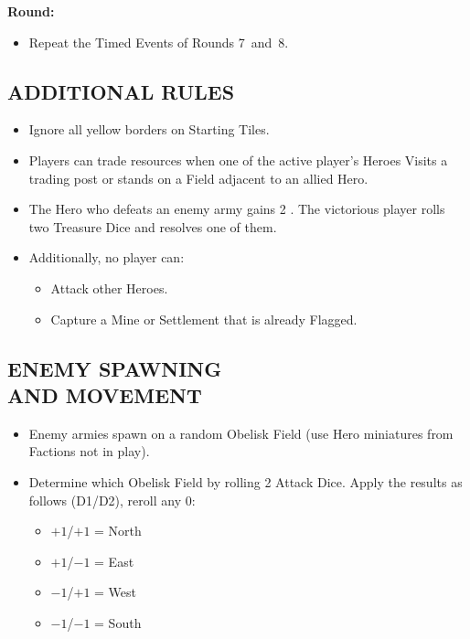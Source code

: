 \begin{multicols}{2}
\textbf{ Round:}
\begin{itemize}
  \item Repeat the Timed Events of Rounds \mbox{7 and 8.}
\end{itemize}
\vspace{-0.5em}

\subsection*{\MakeUppercase{Additional Rules}}

\begin{itemize}
  \item Ignore all yellow borders on Starting Tiles.
  \item Players can trade resources when one of the active player's Heroes Visits a trading post or stands on a Field adjacent to an allied Hero.
  \item The Hero who defeats an enemy army gains 2 .
    The victorious player rolls two Treasure Dice and resolves one of them.
  \item Additionally, no player can:
  \begin{itemize}
      \item Attack other Heroes.
      \item Capture a Mine or Settlement that is already Flagged.
  \end{itemize}
\end{itemize}

\subsection*{\MakeUppercase{Enemy Spawning\\and Movement}}

\begin{itemize}
  \item Enemy armies spawn on a random Obelisk Field (use Hero miniatures from Factions not in play).
  \item Determine which Obelisk Field by rolling 2 Attack Dice. Apply the results as follows (D1/D2), reroll any 0:
  \begin{itemize}
    \item $+1$/$+1$ = North
    \item $+1$/$-1$ = East
    \item $-1$/$+1$ = West
    \item $-1$/$-1$ = South
  \end{itemize}


\end{itemize}
\end{multicols}

